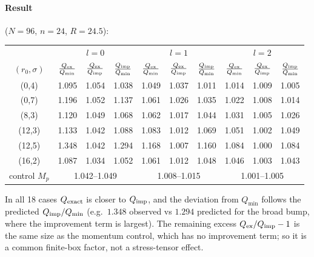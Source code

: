 \documentclass[11pt]{article}
\begin{document}
\paragraph{Result} ($N=96$, $n=24$, $R=24.5$):
\begin{center}\small
\begin{tabular}{c|ccc|ccc|ccc}\toprule
& \multicolumn{3}{c|}{$l=0$} & \multicolumn{3}{c|}{$l=1$} & \multicolumn{3}{c}{$l=2$}\\
$(r_0,\sigma)$ & $\frac{Q_{\rm ex}}{Q_{\min}}$ & $\frac{Q_{\rm ex}}{Q_{\rm imp}}$ & $\frac{Q_{\rm imp}}{Q_{\min}}$ & $\frac{Q_{\rm ex}}{Q_{\min}}$ & $\frac{Q_{\rm ex}}{Q_{\rm imp}}$ & $\frac{Q_{\rm imp}}{Q_{\min}}$ & $\frac{Q_{\rm ex}}{Q_{\min}}$ & $\frac{Q_{\rm ex}}{Q_{\rm imp}}$ & $\frac{Q_{\rm imp}}{Q_{\min}}$\\\midrule
(0,4) & 1.095 & 1.054 & 1.038 & 1.049 & 1.037 & 1.011 & 1.014 & 1.009 & 1.005\\
(0,7) & 1.196 & 1.052 & 1.137 & 1.061 & 1.026 & 1.035 & 1.022 & 1.008 & 1.014\\
(8,3) & 1.120 & 1.049 & 1.068 & 1.062 & 1.017 & 1.044 & 1.031 & 1.005 & 1.026\\
(12,3) & 1.133 & 1.042 & 1.088 & 1.083 & 1.012 & 1.069 & 1.051 & 1.002 & 1.049\\
(12,5) & 1.348 & 1.042 & 1.294 & 1.168 & 1.007 & 1.160 & 1.084 & 1.000 & 1.084\\
(16,2) & 1.087 & 1.034 & 1.052 & 1.061 & 1.012 & 1.048 & 1.046 & 1.003 & 1.043\\\midrule
control $M_p$ & \multicolumn{3}{c|}{1.042--1.049} & \multicolumn{3}{c|}{1.008--1.015} & \multicolumn{3}{c}{1.001--1.005}\\\bottomrule
\end{tabular}
\end{center}
In all 18 cases $Q_{\rm exact}$ is closer to $Q_{\rm imp}$, and the deviation from $Q_{\min}$ follows the predicted $Q_{\rm imp}/Q_{\min}$ (e.g.\ $1.348$ observed vs $1.294$ predicted for the broad bump, where the improvement term is largest). The remaining excess $Q_{\rm ex}/Q_{\rm imp}-1$ is the same size as the momentum control, which has no improvement term; so it is a common finite-box factor, not a stress-tensor effect.
\end{document}
